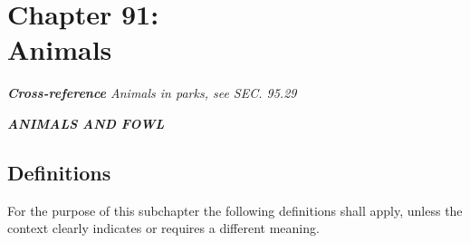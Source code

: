 \chapter*{Chapter 91: \\
	Animals}
    \minitoc
    \emph{\textbf{Cross-reference} Animals in parks, see SEC. 95.29}
    \pagebreak


\begin{center}
\emph{\textbf{\LARGE{ANIMALS AND FOWL}}}
\end{center}

\section{Definitions}
For the purpose of this subchapter the following definitions shall apply, unless the context clearly indicates or requires a different meaning.
